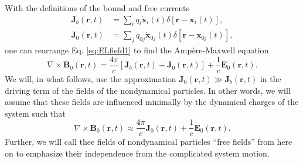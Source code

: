 \documentclass{article}
\begin{document}
With the definitions of the bound and free currents
\begin{equation}
\begin{split}
\mathbf{J}_b(\mathbf{r},t) &= \sum_iq_i\dot{\mathbf{x}}_i(t)\delta[\mathbf{r} - \mathbf{x}_i(t)],\\
\mathbf{J}_0(\mathbf{r},t) &= \sum_jq_{0j}\dot{\mathbf{x}}_{0j}(t)\delta[\mathbf{r} - \mathbf{x}_{0j}(t)],
\end{split}
\end{equation}
one can rearrange Eq. \eqref{eq:ELfield1} to find the Amp\`{e}re-Maxwell equation
\begin{equation}
\nabla\times\mathbf{B}_0(\mathbf{r},t) = \frac{4\pi}{c}\left[\mathbf{J}_b(\mathbf{r},t) + \mathbf{J}_0(\mathbf{r},t)\right] + \frac{1}{c}\dot{\mathbf{E}}_0(\mathbf{r},t).
\end{equation}
We will, in what follows, use the approximation $\mathbf{J}_0(\mathbf{r},t)\gg\mathbf{J}_b(\mathbf{r},t)$ in the driving term of the fields of the nondynamical particles. In other words, we will assume that these fields are influenced minimally by the dynamical charges of the system such that
\begin{equation}
\nabla\times\mathbf{B}_0(\mathbf{r},t) \approx \frac{4\pi}{c}\mathbf{J}_0(\mathbf{r},t) + \frac{1}{c}\dot{\mathbf{E}}_0(\mathbf{r},t).
\end{equation}
Further, we will call thee fields of nondynamical particles ``free fields'' from here on to emphasize their independence from the complicated system motion.
\end{document}
